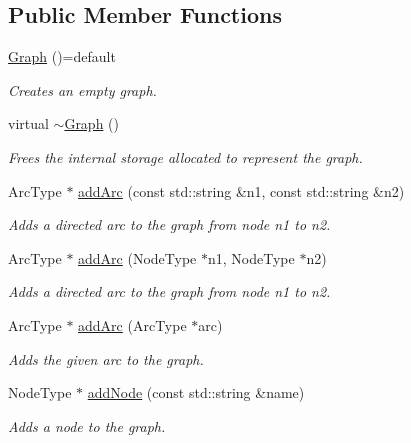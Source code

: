 \subsection*{Public Member Functions}
\begin{DoxyCompactItemize}
\item 
\mbox{\hyperlink{classGraph_a0c40af42cad207665228815f0359bbd3}{Graph}} ()=default
\begin{DoxyCompactList}\small\item\em Creates an empty graph. \end{DoxyCompactList}\item 
virtual \mbox{\hyperlink{classGraph_af5a604e5e9e4d68dbc10b312e59f678f}{$\sim$\+Graph}} ()
\begin{DoxyCompactList}\small\item\em Frees the internal storage allocated to represent the graph. \end{DoxyCompactList}\item 
Arc\+Type $\ast$ \mbox{\hyperlink{classGraph_aad2e9fedd7110ae2fb6873c5e2d29941}{add\+Arc}} (const std\+::string \&n1, const std\+::string \&n2)
\begin{DoxyCompactList}\small\item\em Adds a directed arc to the graph from node n1 to n2. \end{DoxyCompactList}\item 
Arc\+Type $\ast$ \mbox{\hyperlink{classGraph_a7280d3cd76bab82df392ba91ed5257c6}{add\+Arc}} (Node\+Type $\ast$n1, Node\+Type $\ast$n2)
\begin{DoxyCompactList}\small\item\em Adds a directed arc to the graph from node n1 to n2. \end{DoxyCompactList}\item 
Arc\+Type $\ast$ \mbox{\hyperlink{classGraph_aa1b6553e579c03260253a2d731668dfa}{add\+Arc}} (Arc\+Type $\ast$arc)
\begin{DoxyCompactList}\small\item\em Adds the given arc to the graph. \end{DoxyCompactList}\item 
Node\+Type $\ast$ \mbox{\hyperlink{classGraph_acd763aa09491315536b5d2734cd82b89}{add\+Node}} (const std\+::string \&name)
\begin{DoxyCompactList}\small\item\em Adds a node to the graph. \end{DoxyCompactList}\item 

\end{DoxyCompactItemize}
